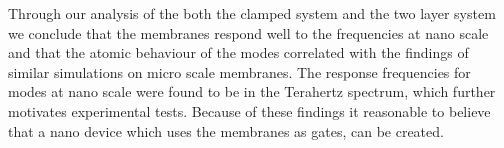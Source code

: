 Through our analysis of the both the clamped system and the two layer system we conclude that the membranes respond well to the frequencies at nano scale and that the atomic behaviour of the modes correlated with the findings of similar simulations on micro scale membranes. The response frequencies for modes at nano scale were found to be in the Terahertz spectrum, which further motivates experimental tests. Because of these findings it reasonable to believe that a nano device which uses the membranes as gates, can be created. 